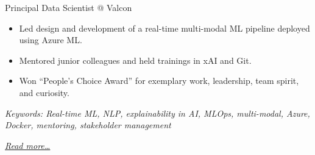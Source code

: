 \large{Principal Data Scientist @ Valcon}

\normalsize
\begin{itemize}  
    \item Led design and development of a real-time multi-modal ML pipeline deployed using Azure ML.
    \item Mentored junior colleagues and held trainings in xAI and Git.
    \item Won “People's Choice Award” for exemplary work, leadership, team
    spirit, and curiosity.
\end{itemize}

{\footnotesize\textit{Keywords: Real-time ML, NLP, explainability in AI, MLOps, multi-modal, Azure, Docker, mentoring, stakeholder management}}

\hfill{\small{\textit{\hyperref[sec:valcon]{Read more…}}}}

